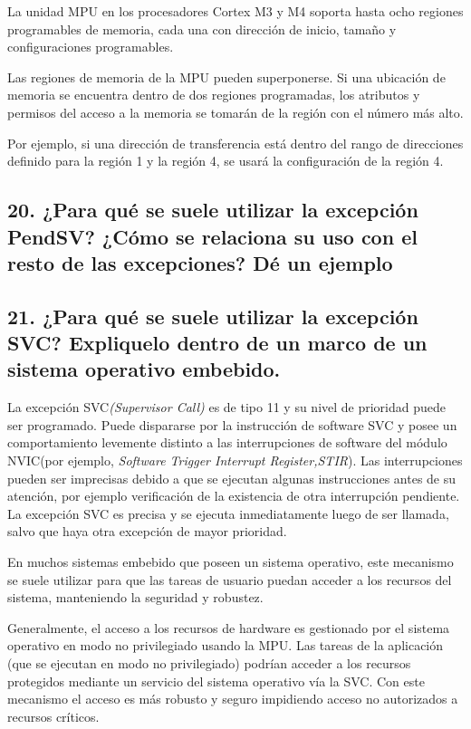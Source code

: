 \documentclass[10pt,a4paper,twoside,spanish]{article}	%
\begin{document}
La unidad MPU en los procesadores Cortex M3 y M4 soporta hasta ocho regiones programables de memoria, cada una con dirección de inicio, tamaño y configuraciones programables.

Las regiones de memoria de la MPU pueden superponerse. Si una ubicación de memoria se encuentra dentro de dos regiones programadas, los atributos y permisos del acceso a la memoria se tomarán de la región con el número más alto.

Por ejemplo, si una dirección de transferencia está dentro del rango de direcciones definido para la región 1 y la región 4, se usará la configuración de la región 4.


\subsection*{20. ¿Para qué se suele utilizar la excepción PendSV? ¿Cómo se relaciona su uso con el resto de las excepciones? Dé un ejemplo}

\subsection*{21. ¿Para qué se suele utilizar la excepción SVC? Expliquelo dentro de un marco de un sistema operativo embebido.}

La excepción SVC\textit{(Supervisor Call)} es de tipo 11 y su nivel de prioridad puede ser programado. Puede dispararse por la instrucción de software SVC y posee un comportamiento levemente distinto a las interrupciones de software del módulo NVIC(por ejemplo, \textit{Software Trigger Interrupt Register,STIR}). Las interrupciones pueden ser imprecisas debido a que se ejecutan algunas instrucciones antes de su atención, por ejemplo verificación de la existencia de otra interrupción pendiente. La excepción SVC es precisa y se ejecuta inmediatamente luego de ser llamada, salvo que haya otra excepción de mayor prioridad.

En muchos sistemas embebido que poseen un sistema operativo, este mecanismo se suele utilizar para que las tareas de usuario puedan acceder a los recursos del sistema, manteniendo la seguridad y robustez.

Generalmente, el acceso a los recursos de hardware es gestionado por el sistema operativo en modo no privilegiado usando la MPU. Las tareas de la aplicación (que se ejecutan en modo no privilegiado) podrían acceder a los recursos protegidos mediante un servicio del sistema operativo vía la SVC. Con este mecanismo el acceso es más robusto y seguro impidiendo acceso no autorizados a recursos críticos.  
\end{document}
